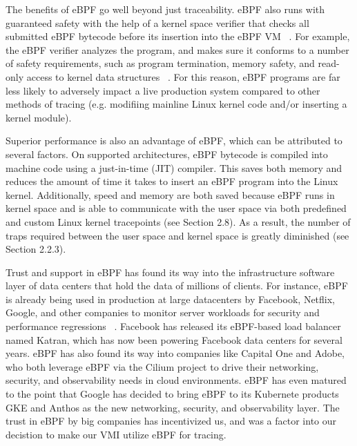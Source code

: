 \documentclass{report}
\begin{document}
\begin{spacing}{1.5}
{\large
\noindent The benefits of eBPF go well beyond just traceability. eBPF also runs with guaranteed safety with the help of a kernel space verifier that checks all submitted eBPF bytecode before its insertion into the eBPF VM ~\cite{findlay2021practical}. For example, the eBPF verifier analyzes the program, and makes sure it conforms to a number of safety requirements, such as program termination, memory safety, and read-only access to kernel data structures ~\cite{findlay2021practical}. For this reason, eBPF programs are far less likely to adversely impact a live production system compared to other methods of tracing (e.g. modifiing mainline Linux kernel code and/or inserting a kernel module).
\newline
}

{\large
\noindent Superior performance is also an advantage of eBPF, which can be attributed to several factors. On supported architectures, eBPF bytecode is compiled into machine code using a just-in-time (JIT) compiler. This saves both memory and reduces the amount of time it takes to insert an eBPF program into the Linux kernel. Additionally, speed and memory are both saved because eBPF runs in kernel space and is able to communicate with the user space via both predefined and custom Linux kernel tracepoints (see Section 2.8). As a result, the number of traps required between the user space and kernel space is greatly diminished (see Section 2.2.3).
\newline
}

{\large
\noindent Trust and support in eBPF has found its way into the infrastructure software layer of data centers that hold the data of millions of clients. For instance, eBPF is already being used in production at large datacenters by Facebook, Netflix, Google, and other companies to monitor server workloads for security and performance regressions ~\cite{case2021fixing}. Facebook has released its eBPF-based load balancer named Katran, which has now been powering Facebook data centers for several years. eBPF has also found its way into companies like Capital One and Adobe, who both leverage eBPF via the Cilium project to drive their networking, security, and observability needs in cloud environments. eBPF has even matured to the point that Google has decided to bring eBPF to its Kubernete products GKE and Anthos as the new networking, security, and observability layer. The trust in eBPF by big companies has incentivized us, and was a factor into our decistion to make our VMI utilize eBPF for tracing.
\newline
}














\end{spacing}
\end{document}
